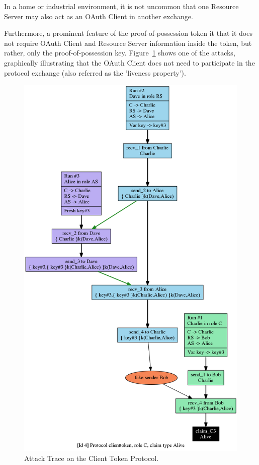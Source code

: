\documentclass[peerreview, a4paper, 7pt]{IEEEtran}
\begin{document}
In a home or industrial environment, it is not uncommon that one Resource Server may also act as an OAuth Client in another exchange. 


Furthermore, a prominent feature of the proof-of-possession token it that it does not require OAuth Client and Resource Server information inside the token, but rather, only the proof-of-possession key. Figure~\ref{client-token-attack-figure} shows one of the attacks, graphically illustrating that the OAuth Client does not need to participate in the protocol exchange (also referred as the 'liveness property').

\begin{figure}[!htbp]
 \centering
 \includegraphics[scale=0.50]{client-token-attack.png}
 \caption{Attack Trace on the Client Token Protocol.}
 \label{client-token-attack-figure}
\end{figure}
\end{document}
